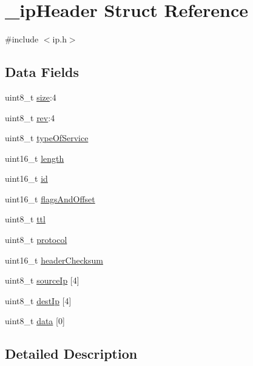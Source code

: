 \hypertarget{struct__ipHeader}{}\section{\+\_\+ip\+Header Struct Reference}
\label{struct__ipHeader}


{\ttfamily \#include $<$ip.\+h$>$}

\subsection*{Data Fields}
\begin{DoxyCompactItemize}
\item 
uint8\+\_\+t \hyperlink{struct__ipHeader_a73d0b3ca182782ffdf4185695e542bed}{size}\+:4
\item 
uint8\+\_\+t \hyperlink{struct__ipHeader_a78817fe0f8a50b109a2d363908aacd7e}{rev}\+:4
\item 
uint8\+\_\+t \hyperlink{struct__ipHeader_ad05cb0a46178ce1e2ad5bd70477bcab0}{type\+Of\+Service}
\item 
uint16\+\_\+t \hyperlink{struct__ipHeader_aa57d8aded3d774453b430c48b537037b}{length}
\item 
uint16\+\_\+t \hyperlink{struct__ipHeader_a7d8dea2d6d12f6a9df6aa7351eb0f51e}{id}
\item 
uint16\+\_\+t \hyperlink{struct__ipHeader_a4acedf015fa0b20895027c41579fd969}{flags\+And\+Offset}
\item 
uint8\+\_\+t \hyperlink{struct__ipHeader_ab8b31781ffe4bba98f9d7441cde7a430}{ttl}
\item 
uint8\+\_\+t \hyperlink{struct__ipHeader_a2fd883d2f1fae6b284bffe605c7c0191}{protocol}
\item 
uint16\+\_\+t \hyperlink{struct__ipHeader_a188591a18d300fa918419b432732e875}{header\+Checksum}
\item 
uint8\+\_\+t \hyperlink{struct__ipHeader_acb7602cdc4168dbc81785c9d8ad4b8d0}{source\+Ip} \mbox{[}4\mbox{]}
\item 
uint8\+\_\+t \hyperlink{struct__ipHeader_a6bb2871daa56f2608e2ef62866fce3d4}{dest\+Ip} \mbox{[}4\mbox{]}
\item 
uint8\+\_\+t \hyperlink{struct__ipHeader_a97ae9e02145ea5df5a2fe2afdf8955b6}{data} \mbox{[}0\mbox{]}
\end{DoxyCompactItemize}


\subsection{Detailed Description}


